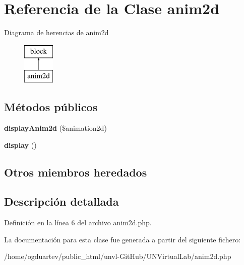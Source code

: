 \hypertarget{classanim2d}{}\section{Referencia de la Clase anim2d}
\label{classanim2d}
Diagrama de herencias de anim2d\begin{figure}[H]
\begin{center}
\leavevmode
\includegraphics[height=2.000000cm]{classanim2d}
\end{center}
\end{figure}
\subsection*{Métodos públicos}
\begin{DoxyCompactItemize}
\item 
\mbox{\label{classanim2d_a790ab010b1ab2211bf6fcbd8312b311c}} 
{\bfseries display\+Anim2d} (\$animation2d)
\item 
\mbox{\label{classanim2d_ac75636f962552bb25edd7e31e8c8a07c}} 
{\bfseries display} ()
\end{DoxyCompactItemize}
\subsection*{Otros miembros heredados}


\subsection{Descripción detallada}


Definición en la línea 6 del archivo anim2d.\+php.



La documentación para esta clase fue generada a partir del siguiente fichero\+:\begin{DoxyCompactItemize}
\item 
/home/ogduartev/public\+\_\+html/unvl-\/\+Git\+Hub/\+U\+N\+Virtual\+Lab/anim2d.\+php\end{DoxyCompactItemize}
